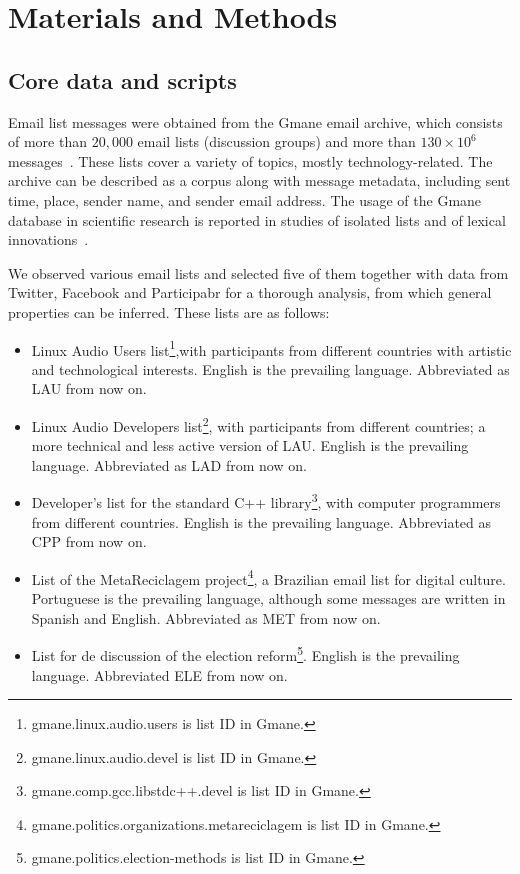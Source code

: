 

\chapter{Materials and Methods}\label{ch:mat}

\section{Core data and scripts}\label{sec:data}\label{scripts}
Email list messages were obtained from
the Gmane email archive, which consists of more than $20,000$
email lists (discussion groups) and more than $130\times 10^6$ messages~\cite{Gmanewikipedia}. These lists cover a variety of topics, mostly technology-related. The archive can be described as a corpus along with message metadata, including sent time, place, sender name, and sender email address.
The usage of the Gmane database in scientific research is reported in studies of isolated lists and of lexical innovations~\cite{Gmane2,bird}. 

We observed various email lists and selected five of them together with data from Twitter, Facebook and Participabr for a thorough analysis,
from which general properties can be inferred. These lists are as follows:

\begin{itemize}
\item Linux Audio Users list\footnote{gmane.linux.audio.users is list ID in Gmane.},with participants from different countries with artistic and technological interests. English is the prevailing language. Abbreviated as LAU from now on.

\item Linux Audio Developers list\footnote{gmane.linux.audio.devel is list ID in Gmane.}, with participants from different countries; a more technical and less active version of LAU. English is the prevailing language. Abbreviated as LAD from now on.

\item Developer's list for the standard C++ library\footnote{gmane.comp.gcc.libstdc++.devel is list ID in Gmane.}, with computer programmers from different countries. English is the prevailing language. Abbreviated as CPP from now on.
\item List of the MetaReciclagem project\footnote{gmane.politics.organizations.metareciclagem is list ID in Gmane.}, a Brazilian email list for digital culture. 	Portuguese is the prevailing language, although some messages are written in Spanish and English. Abbreviated as MET from now on.
\item List for de discussion of the election reform\footnote{gmane.politics.election-methods is list ID in Gmane.}. English is the prevailing language. Abbreviated ELE from now on.
\end{itemize} 

